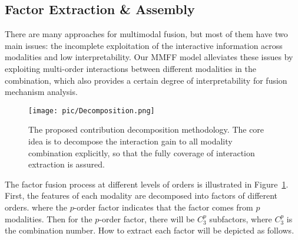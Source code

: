 \documentclass{article}
\begin{document}
\subsection{Factor Extraction \& Assembly}
There are many approaches for multimodal fusion, but most of them have two main issues: the incomplete exploitation of the interactive information across modalities and low interpretability. Our MMFF model alleviates these issues by exploiting multi-order interactions between different modalities in the combination, which also provides a certain degree of interpretability for fusion mechanism analysis.

\begin{figure}[!t]
	\centering
	\texttt{[image: pic/Decomposition.png]}
	\caption{The proposed contribution decomposition methodology. The core idea is to decompose the interaction gain to all modality combination explicitly, so that the fully coverage of interaction extraction is assured.}
	\label{fig:decomp}
\end{figure} 
		
The factor fusion process at different levels of orders is illustrated in Figure~\ref{fig:decomp}. First, the features of each modality are decomposed into factors of different orders.
where the $p$-order factor indicates that the factor comes from $p$ modalities.
Then for the $p$-order factor, there will be $C_{3}^{p}$ subfactors, where $C_{3}^p$ is the combination number. How to extract each factor will be depicted as follows.
		
\end{document}
